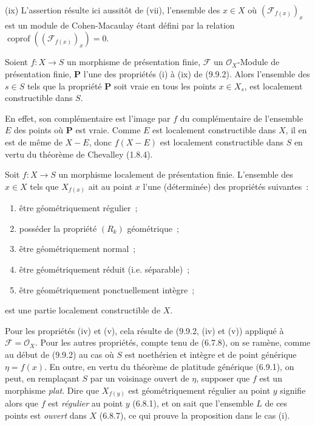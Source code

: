 (ix) L'assertion résulte ici aussitôt de (vii), l'ensemble des $x\in X$ où
$(\mathcal F_{f(x)})_x$ est un module de Cohen-Macaulay étant défini par la
relation $\operatorname{coprof}((\mathcal F_{f(x)})_x)=0$.

\begin{corollary}[9.9.3]
\label{IV.9.9.3-fr}
Soient $f:X\to S$ un morphisme de présentation finie, $\mathcal F$ un
$\mathcal O_X$-Module de présentation finie, $\mathbf P$ l'une des propriétés
(i) à (ix) de (9.9.2). Alors l'ensemble des $s\in S$ tels que la propriété
$\mathbf P$ soit vraie en tous les points $x\in X_s$, est localement
constructible dans $S$.
\end{corollary}

En effet, son complémentaire est l'image par $f$ du complémentaire de
l'ensemble $E$ des points où $\mathbf P$ est vraie. Comme $E$ est localement
constructible dans $X$, il en est de même de $X-E$, donc $f(X-E)$ est
localement constructible dans $S$ en vertu du théorème de Chevalley (1.8.4).

\begin{proposition}[9.9.4]
\label{IV.9.9.4-fr}
Soit $f:X\to S$ un morphisme localement de présentation finie. L'ensemble des
$x\in X$ tels que $X_{f(x)}$ ait au point $x$ l'une (déterminée) des propriétés
suivantes~:
\begin{enumerate}
\item[(i)] être géométriquement régulier~;
\item[(ii)] posséder la propriété $(R_k)$ géométrique~;
\item[(iii)] être géométriquement normal~;
\item[(iv)] être géométriquement réduit (i.e. séparable)~;
\item[(v)] être géométriquement ponctuellement intègre~;
\end{enumerate}
est une partie localement constructible de $X$.
\end{proposition}

Pour les propriétés (iv) et (v), cela résulte de (9.9.2, (iv) et (v)) appliqué à
$\mathcal F=\mathcal O_X$. Pour les autres propriétés, compte tenu de (6.7.8),
on se ramène, comme au début de (9.9.2) au cas où $S$ est noethérien et intègre
et de point générique $\eta=f(x)$. En outre, en vertu du théorème de platitude
générique (6.9.1), on peut, en remplaçant $S$ par un voisinage ouvert de
$\eta$, supposer que $f$ est un morphisme \emph{plat}. Dire que $X_{f(y)}$ est
géométriquement régulier au point $y$ signifie alors que $f$ est
\emph{régulier} au point $y$ (6.8.1), et on sait que l'ensemble $L$ de ces
points est \emph{ouvert} dans $X$ (6.8.7), ce qui prouve la proposition dans le
cas (i).


